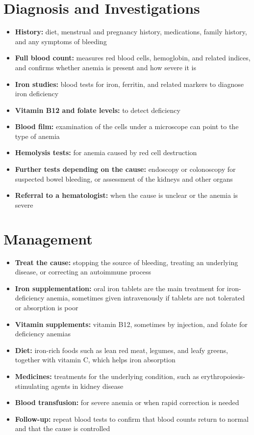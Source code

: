 \section*{Diagnosis and Investigations}
\begin{itemize}
    \item \textbf{History:} diet, menstrual and pregnancy history, medications, family history, and any symptoms of bleeding
    \item \textbf{Full blood count:} measures red blood cells, hemoglobin, and related indices, and confirms whether anemia is present and how severe it is
    \item \textbf{Iron studies:} blood tests for iron, ferritin, and related markers to diagnose iron deficiency
    \item \textbf{Vitamin B12 and folate levels:} to detect deficiency
    \item \textbf{Blood film:} examination of the cells under a microscope can point to the type of anemia
    \item \textbf{Hemolysis tests:} for anemia caused by red cell destruction
    \item \textbf{Further tests depending on the cause:} endoscopy or colonoscopy for suspected bowel bleeding, or assessment of the kidneys and other organs
    \item \textbf{Referral to a hematologist:} when the cause is unclear or the anemia is severe
\end{itemize}

\section*{Management}
\begin{itemize}
    \item \textbf{Treat the cause:} stopping the source of bleeding, treating an underlying disease, or correcting an autoimmune process
    \item \textbf{Iron supplementation:} oral iron tablets are the main treatment for iron-deficiency anemia, sometimes given intravenously if tablets are not tolerated or absorption is poor
    \item \textbf{Vitamin supplements:} vitamin B12, sometimes by injection, and folate for deficiency anemias
    \item \textbf{Diet:} iron-rich foods such as lean red meat, legumes, and leafy greens, together with vitamin C, which helps iron absorption
    \item \textbf{Medicines:} treatments for the underlying condition, such as erythropoiesis-stimulating agents in kidney disease
    \item \textbf{Blood transfusion:} for severe anemia or when rapid correction is needed
    \item \textbf{Follow-up:} repeat blood tests to confirm that blood counts return to normal and that the cause is controlled
\end{itemize}

